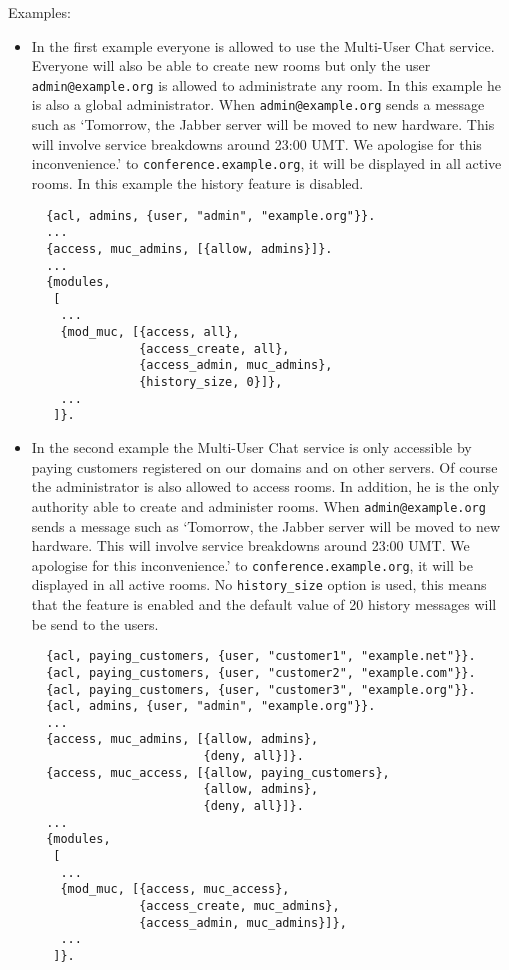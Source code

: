 \documentclass[a4paper,10pt]{article}
\newcommand{\jid}[1]{\texttt{#1}}
\newcommand{\term}[1]{\texttt{#1}}
\newcommand{\Jabber}{Jabber}
\begin{document}
Examples:
\begin{itemize}
\item In the first example everyone is allowed to use the Multi-User Chat
  service. Everyone will also be able to create new rooms but only the user
  \jid{admin@example.org} is allowed to administrate any room. In this
  example he is also a global administrator. When \jid{admin@example.org}
  sends a message such as `Tomorrow, the \Jabber{} server will be moved
  to new hardware. This will involve service breakdowns around 23:00 UMT.
  We apologise for this inconvenience.' to \jid{conference.example.org},
  it will be displayed in all active rooms. In this example the history
  feature is disabled.
  \begin{verbatim}
  {acl, admins, {user, "admin", "example.org"}}.
  ...
  {access, muc_admins, [{allow, admins}]}.
  ...
  {modules,
   [
    ...
    {mod_muc, [{access, all},
               {access_create, all},
               {access_admin, muc_admins},
               {history_size, 0}]},
    ...
   ]}.
\end{verbatim}
\item In the second example the Multi-User Chat service is only accessible by
  paying customers registered on our domains and on other servers. Of course
  the administrator is also allowed to access rooms. In addition, he is the
  only authority able to create and administer rooms. When
  \jid{admin@example.org} sends a message such as `Tomorrow, the \Jabber{}
  server will be moved to new hardware. This will involve service breakdowns
  around 23:00 UMT. We apologise for this inconvenience.' to
  \jid{conference.example.org}, it will be displayed in all active rooms. No
  \term{history\_size} option is used, this means that the feature is enabled
  and the default value of 20 history messages will be send to the users.
  \begin{verbatim}
  {acl, paying_customers, {user, "customer1", "example.net"}}.
  {acl, paying_customers, {user, "customer2", "example.com"}}.
  {acl, paying_customers, {user, "customer3", "example.org"}}.
  {acl, admins, {user, "admin", "example.org"}}.
  ...
  {access, muc_admins, [{allow, admins},
                        {deny, all}]}.
  {access, muc_access, [{allow, paying_customers},
                        {allow, admins},
                        {deny, all}]}.
  ...
  {modules,
   [
    ...
    {mod_muc, [{access, muc_access},
               {access_create, muc_admins},
               {access_admin, muc_admins}]},
    ...
   ]}.
\end{verbatim}
\end{itemize}
\end{document}
